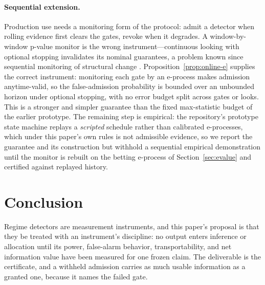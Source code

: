 \documentclass[3p]{elsarticle}
\begin{document}
\paragraph{Sequential extension.} Production use needs a monitoring form of
the protocol: admit a detector when rolling evidence first clears the gates,
revoke when it degrades. A window-by-window p-value monitor is the wrong
instrument---continuous looking with optional stopping invalidates its
nominal guarantees, a problem known since sequential monitoring of structural
change \citep{ChuStinchcombeWhite1996}. Proposition~\ref{prop:online-e}
supplies the correct instrument: monitoring each gate by an e-process makes
admission anytime-valid, so the false-admission probability is bounded over
an unbounded horizon under optional stopping, with no error budget split
across gates or looks. This is a stronger and simpler guarantee than the
fixed max-statistic budget of the earlier prototype. The remaining step is
empirical: the repository's prototype state machine replays a \emph{scripted}
schedule rather than calibrated e-processes, which under this paper's own
rules is not admissible evidence, so we report the guarantee and its
construction but withhold a sequential empirical demonstration until the
monitor is rebuilt on the betting e-process of Section~\ref{sec:evalue} and
certified against replayed history.

\section{Conclusion}
\label{sec:conclusion}

Regime detectors are measurement instruments, and this paper's proposal is
that they be treated with an instrument's discipline: no output enters
inference or allocation until its power, false-alarm behavior,
transportability, and net information value have been measured for one
frozen claim. The deliverable is the certificate, and a withheld admission
carries as much usable information as a granted one, because it names the
failed gate.
\end{document}
